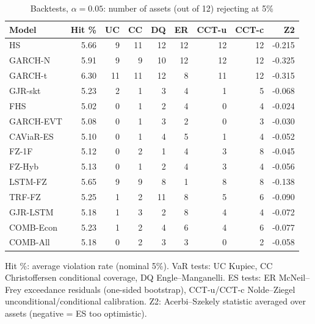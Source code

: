 \begin{table}[htbp]
\centering
\footnotesize
\caption{Backtests, $\alpha=0.05$: number of assets (out of 12) rejecting at 5\%}
\label{tab:bt_a050}
\begin{tabular}{lrrrrrrrr}
\toprule
Model & Hit \% & UC & CC & DQ & ER & CCT-u & CCT-c & Z2 \\
\midrule
HS & 5.66 & 9 & 11 & 12 & 12 & 12 & 12 & -0.215 \\
GARCH-N & 5.91 & 9 & 9 & 10 & 12 & 12 & 12 & -0.325 \\
GARCH-t & 6.30 & 11 & 11 & 12 & 8 & 11 & 12 & -0.315 \\
GJR-skt & 5.23 & 2 & 1 & 3 & 4 & 1 & 5 & -0.068 \\
FHS & 5.02 & 0 & 1 & 2 & 4 & 0 & 4 & -0.024 \\
GARCH-EVT & 5.08 & 0 & 1 & 3 & 2 & 0 & 3 & -0.030 \\
CAViaR-ES & 5.10 & 0 & 1 & 4 & 5 & 1 & 4 & -0.052 \\
FZ-1F & 5.12 & 0 & 2 & 1 & 4 & 3 & 8 & -0.045 \\
FZ-Hyb & 5.13 & 0 & 1 & 2 & 4 & 3 & 4 & -0.056 \\
LSTM-FZ & 5.65 & 9 & 9 & 8 & 1 & 8 & 8 & -0.138 \\
TRF-FZ & 5.25 & 1 & 2 & 11 & 8 & 5 & 6 & -0.090 \\
GJR-LSTM & 5.18 & 1 & 3 & 2 & 8 & 4 & 4 & -0.072 \\
COMB-Econ & 5.23 & 1 & 2 & 4 & 6 & 4 & 6 & -0.077 \\
COMB-All & 5.18 & 0 & 2 & 3 & 3 & 0 & 2 & -0.058 \\
\bottomrule
\end{tabular}
\par\smallskip\parbox{\linewidth}{\scriptsize Hit \%: average violation rate (nominal 5\%). VaR tests: UC Kupiec, CC Christoffersen conditional coverage, DQ Engle--Manganelli. ES tests: ER McNeil--Frey exceedance residuals (one-sided bootstrap), CCT-u/CCT-c Nolde--Ziegel unconditional/conditional calibration. Z2: Acerbi--Szekely statistic averaged over assets (negative = ES too optimistic).}
\end{table}